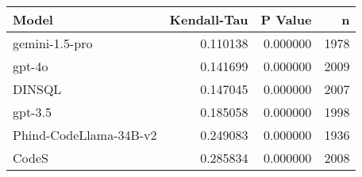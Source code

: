 \begin{tabular}{lrrr}
\toprule
Model & Kendall-Tau & P Value & n \\
\midrule
gemini-1.5-pro & 0.110138 & 0.000000 & 1978 \\
gpt-4o & 0.141699 & 0.000000 & 2009 \\
DINSQL & 0.147045 & 0.000000 & 2007 \\
gpt-3.5 & 0.185058 & 0.000000 & 1998 \\
Phind-CodeLlama-34B-v2 & 0.249083 & 0.000000 & 1936 \\
CodeS & 0.285834 & 0.000000 & 2008 \\
\bottomrule
\end{tabular}
